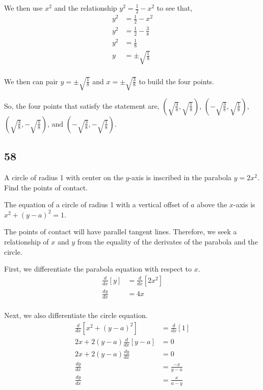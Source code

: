 \documentclass[../hw3.tex]{subfiles}
\begin{document}
We then use $x^2$ and the relationship $y^2 = \frac{1}{2} - x^2$ to see that,
\begin{align*}
    y^2 &= \frac{1}{2} - x^2 \\
    y^2 &= \frac{1}{2} - \frac{3}{8} \\
    y^2 &= \frac{1}{8} \\
    y &= \pm \sqrt{\frac{1}{8}} \\
\end{align*}

We then can pair $y = \pm \sqrt{\frac{1}{8}}$ and $x = \pm \sqrt{\frac{3}{8}}$ to build the four points.

So, the four points that satisfy the statement are, 
$\left( \sqrt{\frac{3}{8}}, \sqrt{\frac{1}{8}} \right)$,
$\left( -\sqrt{\frac{3}{8}}, \sqrt{\frac{1}{8}} \right)$,
$\left( \sqrt{\frac{3}{8}}, -\sqrt{\frac{1}{8}} \right)$, and
$\left( -\sqrt{\frac{3}{8}}, -\sqrt{\frac{1}{8}} \right)$.

\subsection*{58}
A circle of radius 1 with center on the $y$-axis is inscribed
in the parabola $y=2x^2$. Find the points of
contact.


The equation of a circle of radius 1 with a vertical offset of $a$ above the $x$-axis is $x^2+{(y-a)}^2 = 1$.

The points of contact will have parallel tangent lines. Therefore, we seek a relationship of $x$ and $y$ from the equality of the derivates of the parabola and the circle.

First, we differentiate the parabola equation with respect to $x$.
\begin{align*}
    \frac{d}{dx} \left[ y \right] &= \frac{d}{dx} \left[ 2x^2 \right] \\
    \frac{dy}{dx} &= 4x \\
\end{align*}

Next, we also differentiate the circle equation.
\begin{align*}
    \frac{d}{dx} \left[ x^2 + {(y-a)}^2\right] &= \frac{d}{dx} [1] \\
    2x + 2(y-a) \frac{d}{dx} \left[ y-a \right] &= 0 \\
    2x + 2(y-a) \frac{dy}{dx} &= 0 \\
    \frac{dy}{dx} &= \frac{-x}{y-a} \\
    \frac{dy}{dx} &= \frac{x}{a-y} \\
\end{align*}
\end{document}
